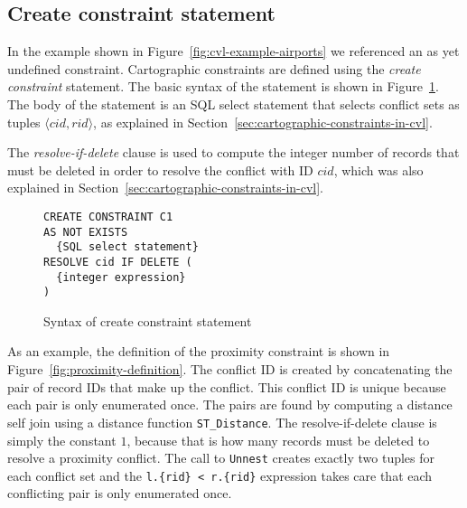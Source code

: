 


\subsection{Create constraint statement}
\label{sec:create-constraint-statement}

In the example shown in Figure~\ref{fig:cvl-example-airports} we referenced an as yet undefined constraint. Cartographic constraints are defined using the \emph{create constraint} statement.  The basic syntax of the statement is shown in Figure~\ref{fig:create-constraint-syntax}. The body of the statement is an SQL select statement that selects conflict sets as tuples $\langle cid, rid\rangle$, as explained in Section~\ref{sec:cartographic-constraints-in-cvl}.

The \emph{resolve-if-delete} clause is used to compute the integer number of records that must be deleted in order to resolve the conflict with ID $cid$, which was also explained in Section~\ref{sec:cartographic-constraints-in-cvl}.

\begin{figure}[htbp]
\begin{center}
\begin{lstlisting}
CREATE CONSTRAINT C1
AS NOT EXISTS
  {SQL select statement}
RESOLVE cid IF DELETE (
  {integer expression}
)
\end{lstlisting}
\caption{Syntax of create constraint statement}
\label{fig:create-constraint-syntax}
\end{center}
\end{figure}

As an example, the definition of the proximity constraint is shown in Figure~\ref{fig:proximity-definition}. The conflict ID is created by concatenating the pair of record IDs that make up the conflict. This conflict ID is unique because each pair is only enumerated once. The pairs are found by computing a distance self join using a distance function \texttt{ST\_Distance}. The resolve-if-delete clause is simply the constant $1$, because that is how many records must be deleted to resolve a proximity conflict. The call to \texttt{Unnest} creates exactly two tuples for each conflict set and the \texttt{l.\{rid\} < r.\{rid\}} expression takes care that each conflicting pair is only enumerated once.

